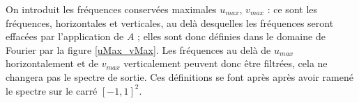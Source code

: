 		On introduit les fréquences conservées maximales $u_{max}$, $v_{max}$ : ce sont les fréquences, horizontales et verticales, au delà desquelles les fréquences seront effacées par l'application de $A$ ; elles sont donc définies dans le domaine de Fourier par la figure \ref{uMax_vMax}. Les fréquences au delà de $u_{max}$ horizontalement et de $v_{max}$ verticalement peuvent donc être filtrées, cela ne changera pas le spectre de sortie. Ces définitions se font après après avoir ramené le spectre sur le carré $[-1,1]^2$.
		
		\begin{figure}
		\centering

\end{figure}
